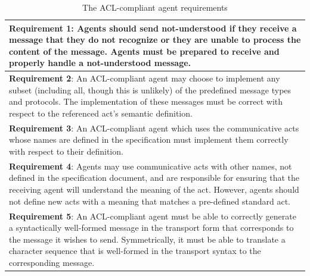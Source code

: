 \documentclass[0main.tex]{subfiles}
\begin{document}
\begin{table}[htbp]
    \caption{The ACL-compliant agent requirements \cite{IntelligentPhysicalAgents2001}}
    \renewcommand{\arraystretch}{1.7}
    \centering\begin{tabular}{p{}}
\toprule
\textbf{Requirement 1}:
Agents should send not-understood if they receive a message that they do not recognize or they are unable to
process the content of the message. Agents must be prepared to receive and properly handle a not-understood message.
\\ \midrule
\textbf{Requirement 2}:
An ACL-compliant agent may choose to implement any subset (including all, though this is
unlikely) of the predefined message types and protocols. The implementation of these messages
must be correct with respect to the referenced act's semantic definition.
 \\ \midrule
\textbf{Requirement 3}:
An ACL-compliant agent which uses the communicative acts whose names are defined in the specification must
implement them correctly with respect to their definition.
\\ \midrule
\textbf{Requirement 4}:
Agents may use communicative acts with other names, not defined in the specification document,
and are responsible for ensuring that the receiving agent will understand the meaning of the
act. However, agents should not define new acts with a meaning that matches a pre-defined
standard act.
 \\ \midrule
\textbf{Requirement 5}:
An ACL-compliant agent must be able to correctly generate a syntactically well-formed message in the transport
form that corresponds to the message it wishes to send. Symmetrically, it must be able to translate a character
sequence that is well-formed in the transport syntax to the corresponding message.
\\ \bottomrule
    \end{tabular}
    \label{requirements}
\end{table}
\end{document}
